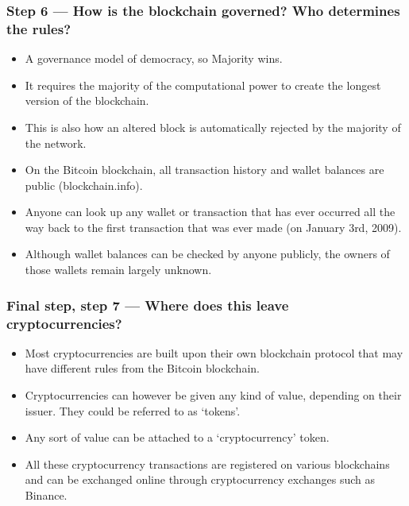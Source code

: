 \begin{frame}[fragile]\frametitle{Step 6 — How is the blockchain governed? Who determines the rules?}
\begin{itemize}
\item A governance model of democracy, so Majority wins.
\item It requires the majority of the computational power to create the longest version of the blockchain. 
\item This is also how an altered block is automatically rejected by the majority of the network.
\item On the Bitcoin blockchain, all transaction history and wallet balances are public (blockchain.info). 
\item Anyone can look up any wallet or transaction that has ever occurred all the way back to the first transaction that was ever made (on January 3rd, 2009). 
\item Although wallet balances can be checked by anyone publicly, the owners of those wallets remain largely unknown.
\end{itemize}


\end{frame}

\begin{frame}[fragile]\frametitle{Final step, step 7 — Where does this leave cryptocurrencies?}
\begin{itemize}
\item Most cryptocurrencies are built upon their own blockchain protocol that may have different rules from the Bitcoin blockchain. 
\item Cryptocurrencies can however be given any kind of value, depending on their issuer. They could be referred to as ‘tokens’. 
\item Any sort of value can be attached to a ‘cryptocurrency’ token. 
\item All these cryptocurrency transactions are registered on various blockchains and can be exchanged online through cryptocurrency exchanges such as Binance. 
\end{itemize}


\end{frame}

